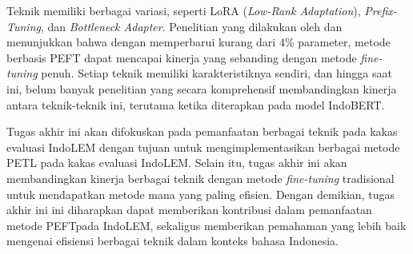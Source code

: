 Teknik \PEFT memiliki berbagai variasi, seperti LoRA (\textit{Low-Rank Adaptation}), \textit{Prefix-Tuning}, dan \textit{Bottleneck Adapter}. Penelitian yang dilakukan oleh \citeauthor{adapter} \parencite{adapter} dan \citeauthor{uvpl} \parencite{uvpl} menunjukkan bahwa dengan memperbarui kurang dari 4\% parameter, metode berbasis PEFT dapat mencapai kinerja yang sebanding dengan metode \textit{fine-tuning} penuh. Setiap teknik memiliki karakteristiknya sendiri, dan hingga saat ini, belum banyak penelitian yang secara komprehensif membandingkan kinerja antara teknik-teknik ini, terutama ketika diterapkan pada model IndoBERT. 

Tugas akhir ini akan difokuskan pada pemanfaatan berbagai teknik \PEFT pada kakas evaluasi IndoLEM dengan tujuan untuk mengimplementasikan berbagai metode PETL pada kakas evaluasi IndoLEM. Selain itu, tugas akhir ini akan membandingkan kinerja berbagai teknik \PEFT dengan metode \textit{fine-tuning} tradisional untuk mendapatkan metode mana yang paling efisien. Dengan demikian, tugas akhir ini ini diharapkan dapat memberikan kontribusi dalam pemanfaatan metode PEFTpada IndoLEM, sekaligus memberikan pemahaman yang lebih baik mengenai efisiensi berbagai teknik \PEFT dalam konteks bahasa Indonesia.
